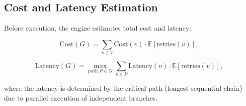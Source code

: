 \subsection{Cost and Latency Estimation}

Before execution, the engine estimates total cost and latency:

\begin{equation}
\text{Cost}(G) = \sum_{v \in V} \text{Cost}(v) \cdot \mathbb{E}[\text{retries}(v)],
\end{equation}

\begin{equation}
\text{Latency}(G) = \max_{\text{path } P \in G} \sum_{v \in P} \text{Latency}(v) \cdot \mathbb{E}[\text{retries}(v)],
\end{equation}

where the latency is determined by the critical path (longest sequential chain) due to parallel execution of independent branches.

